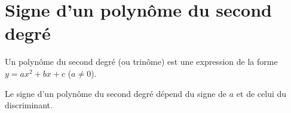 \documentclass[12pt,a4paper]{article}
\begin{document}


\section{Signe d'un polynôme du second degré}

\begin{mydef}
	Un polynôme du second degré (ou trinôme) est une expression de la forme $y=ax^2+bx+c$ ($a \neq 0$).
\end{mydef}

\begin{myprop}
	Le signe d'un polynôme du second degré dépend du signe de $a$ et de celui du discriminant.
\end{myprop}	
		
		
			\newpage
			
\end{document}
